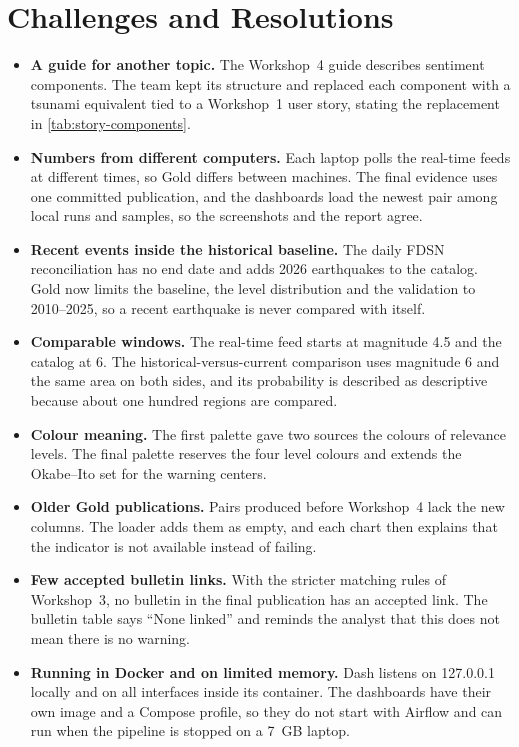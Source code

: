 \documentclass[a4paper,11pt,oneside]{book}
\begin{document}
\chapter{Challenges and Resolutions}
\begin{itemize}
\item \textbf{A guide for another topic.} The Workshop~4 guide describes sentiment components. The team kept its structure and replaced each component with a tsunami equivalent tied to a Workshop~1 user story, stating the replacement in \cref{tab:story-components}.
\item \textbf{Numbers from different computers.} Each laptop polls the real-time feeds at different times, so Gold differs between machines. The final evidence uses one committed publication, and the dashboards load the newest pair among local runs and samples, so the screenshots and the report agree.
\item \textbf{Recent events inside the historical baseline.} The daily FDSN reconciliation has no end date and adds 2026 earthquakes to the catalog. Gold now limits the baseline, the level distribution and the validation to 2010--2025, so a recent earthquake is never compared with itself.
\item \textbf{Comparable windows.} The real-time feed starts at magnitude 4.5 and the catalog at 6. The historical-versus-current comparison uses magnitude 6 and the same area on both sides, and its probability is described as descriptive because about one hundred regions are compared.
\item \textbf{Colour meaning.} The first palette gave two sources the colours of relevance levels. The final palette reserves the four level colours and extends the Okabe--Ito set for the warning centers.
\item \textbf{Older Gold publications.} Pairs produced before Workshop~4 lack the new columns. The loader adds them as empty, and each chart then explains that the indicator is not available instead of failing.
\item \textbf{Few accepted bulletin links.} With the stricter matching rules of Workshop~3, no bulletin in the final publication has an accepted link. The bulletin table says ``None linked'' and reminds the analyst that this does not mean there is no warning.
\item \textbf{Running in Docker and on limited memory.} Dash listens on 127.0.0.1 locally and on all interfaces inside its container. The dashboards have their own image and a Compose profile, so they do not start with Airflow and can run when the pipeline is stopped on a 7~GB laptop.
\end{itemize}
\end{document}

